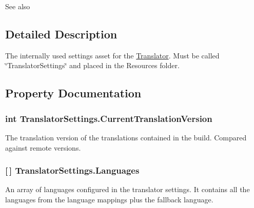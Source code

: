 \begin{DoxyCompactItemize}
\begin{DoxyCompactList}
\begin{DoxySeeAlso}{See also}
\end{DoxySeeAlso}
\end{DoxyCompactList}\end{DoxyCompactItemize}


\subsection{Detailed Description}
The internally used settings asset for the \hyperlink{class_translator}{Translator}. Must be called \char`\"{}\+Translator\+Settings\char`\"{} and placed in the Resources folder. 



\subsection{Property Documentation}
\subsubsection[{\texorpdfstring{Current\+Translation\+Version}{CurrentTranslationVersion}}]{\setlength{\rightskip}{0pt plus 5cm}int Translator\+Settings.\+Current\+Translation\+Version\hspace{0.3cm}{\ttfamily [get]}}\hypertarget{class_translator_settings_a2a603738d719808bc6190cb42923e355}{}\label{class_translator_settings_a2a603738d719808bc6190cb42923e355}


The translation version of the translations contained in the build. Compared against remote versions. 

\subsubsection[{\texorpdfstring{Languages}{Languages}}]{ \mbox{[}$\,$\mbox{]} Translator\+Settings.\+Languages\hspace{0.3cm}{\ttfamily [get]}}\hypertarget{class_translator_settings_a7993a5fdb36afe44e18437c78a7f965b}{}\label{class_translator_settings_a7993a5fdb36afe44e18437c78a7f965b}


An array of languages configured in the translator settings. It contains all the languages from the language mappings plus the fallback language. 

